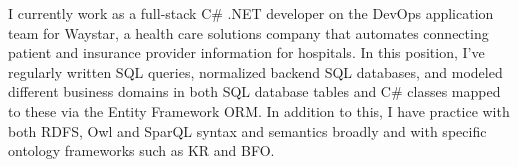 I currently work as a full-stack C\# .NET developer on the DevOps application team for Waystar, 
a health care solutions company that automates connecting patient and insurance provider information for hospitals. In this position, I've regularly written SQL queries, normalized backend SQL databases, and modeled different business domains in both SQL database tables and C\# classes mapped to these via the Entity Framework ORM. 
In addition to this, I have practice with both RDFS, Owl and SparQL syntax and semantics broadly and with specific ontology frameworks such as KR and BFO. 